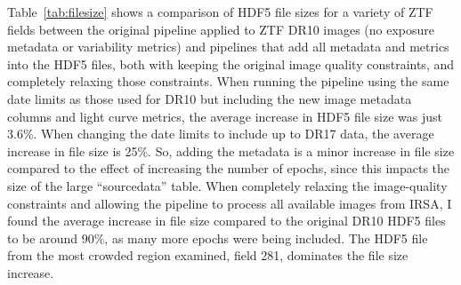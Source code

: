 \documentclass[12pt]{article}
\begin{document}
\vspace{0.2cm}
\noindent
Table~\ref{tab:filesize} shows a comparison of HDF5 file sizes for a variety of ZTF fields between the original pipeline applied to ZTF DR10 images (no exposure metadata or variability metrics) and pipelines that add all metadata and metrics into the HDF5 files, both with keeping the original image quality constraints, and completely relaxing those constraints. When running the pipeline using the same date limits as those used for DR10 but including the new image metadata columns and light curve metrics, the average increase in HDF5 file size was just 3.6\%. When changing the date limits to include up to DR17 data, the average increase in file size is 25\%. So, adding the metadata is a minor increase in file size compared to the effect of increasing the number of epochs, since this impacts the size of the large ``sourcedata'' table. When completely relaxing the image-quality constraints and allowing the pipeline to process all available images from IRSA, I found the average increase in file size compared to the original DR10 HDF5 files to be around 90\%, as many more epochs were being included. The HDF5 file from the most crowded region examined, field 281, dominates the file size increase.
\end{document}
